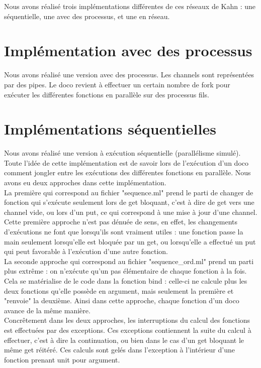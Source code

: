 \documentclass[a4paper, 12pt, twoside]{report}
\begin{document}
Nous avons réalisé trois implémentations différentes de ces réseaux de Kahn : une séquentielle, une avec des processus, et 
une en réseau.

\section{Implémentation avec des processus}

Nous avons réalisé une version avec des processus. Les channels sont représentées par des pipes. Le doco revient à 
effectuer un certain nombre de fork pour exécuter les différentes fonctions en parallèle sur des processus fils.

\section{Implémentations séquentielles}

Nous avons réalisé une version à exécution séquentielle (parallélisme simulé). Toute l'idée de cette implémentation est de 
savoir lors de l'exécution d'un doco comment jongler entre les exécutions des différentes fonctions en parallèle. Nous avons 
eu deux approches dans cette implémentation.\\

La première qui correspond au fichier "sequence.ml" prend le parti de changer de 
fonction qui s'exécute seulement lors de get bloquant, c'est à dire de get vers une channel vide, ou lors d'un put, ce qui 
correspond à une mise à jour d'une channel. Cette première approche n'est pas dénuée de sens, en effet, les changements 
d'exécutions ne font que lorsqu'ils sont vraiment utiles : une fonction passe la main seulement lorsqu'elle est bloquée par un get, 
ou lorsqu'elle a effectué un put qui peut favorable à l'exécution d'une autre fonction.\\

La seconde approche qui correspond au fichier "sequence_ord.ml" prend un parti plus extrême : on n'exécute qu'un pas élémentaire 
de chaque fonction à la fois. Cela se matérialise de le code dans la fonction bind : celle-ci ne calcule plus les deux fonctions 
qu'elle possède en argument, mais seulement la première et "renvoie" la deuxième. Ainsi dans cette approche, 
chaque fonction d'un doco avance de la même manière.\\

Concrêtement dans les deux approches, les interruptions du calcul des fonctions est effectuées par des exceptions. Ces exceptions 
contiennent la suite du calcul à effectuer, c'est à dire la continuation, ou bien dans le cas d'un get bloquant le même get réitéré. 
Ces calculs sont gelés dans l'exception à l'intérieur d'une fonction prenant unit pour argument.
\end{document}

